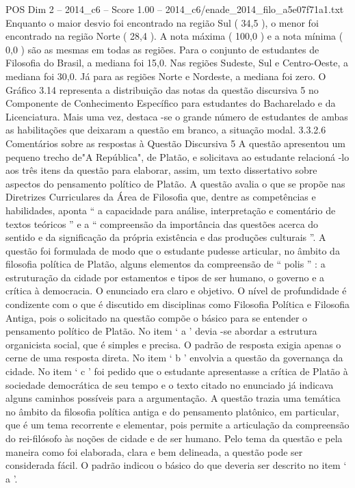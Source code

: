 \begin{textsample}{POS Dim 2 – 2014\_c6 – Score 1.00 – 2014\_c6/enade\_2014\_filo\_a5e07f71a1.txt}
Enquanto o maior desvio foi encontrado na região Sul ( 34,5 ), o menor foi encontrado na região Norte ( 28,4 ).
A nota máxima ( 100,0 ) e a nota mínima ( 0,0 ) são as mesmas em todas as regiões.
Para o conjunto de estudantes de Filosofia do Brasil, a mediana foi 15,0.
Nas regiões Sudeste, Sul e Centro-Oeste, a mediana foi 30,0.
Já para as regiões Norte e Nordeste, a mediana foi zero.
O Gráfico 3.14 representa a distribuição das notas da questão discursiva 5 no Componente de Conhecimento Específico para estudantes do Bacharelado e da Licenciatura.
Mais uma vez, destaca -se o grande número de estudantes de ambas as habilitações que deixaram a questão em branco, a situação modal. 3.3.2.6 Comentários sobre as respostas à Questão Discursiva 5 A questão apresentou um pequeno trecho de"A República", de Platão, e solicitava ao estudante relacioná -lo aos três itens da questão para elaborar, assim, um texto dissertativo sobre aspectos do pensamento político de Platão.
A questão avalia o que se propõe nas Diretrizes Curriculares da Área de Filosofia que, dentre as competências e habilidades, aponta “ a capacidade para análise, interpretação e comentário de textos teóricos ” e a “ compreensão da importância das questões acerca do sentido e da significação da própria existência e das produções culturais ”.
A questão foi formulada de modo que o estudante pudesse articular, no âmbito da filosofia política de Platão, alguns elementos da compreensão de “ polis ” : a estruturação da cidade por estamentos e tipos de ser humano, o governo e a crítica à democracia.
O enunciado era claro e objetivo.
O nível de profundidade é condizente com o que é discutido em disciplinas como Filosofia Política e Filosofia Antiga, pois o solicitado na questão compõe o básico para se entender o pensamento político de Platão.
No item ‘ a ’ devia -se abordar a estrutura organicista social, que é simples e precisa.
O padrão de resposta exigia apenas o cerne de uma resposta direta.
No item ‘ b ’ envolvia a questão da governança da cidade.
No item ‘ c ’ foi pedido que o estudante apresentasse a crítica de Platão à sociedade democrática de seu tempo e o texto citado no enunciado já indicava alguns caminhos possíveis para a argumentação.
A questão trazia uma temática no âmbito da filosofia política antiga e do pensamento platônico, em particular, que é um tema recorrente e elementar, pois permite a articulação da compreensão do rei-filósofo às noções de cidade e de ser humano.
Pelo tema da questão e pela maneira como foi elaborada, clara e bem delineada, a questão pode ser considerada fácil.
O padrão indicou o básico do que deveria ser descrito no item ‘ a ’.

\end{textsample}
